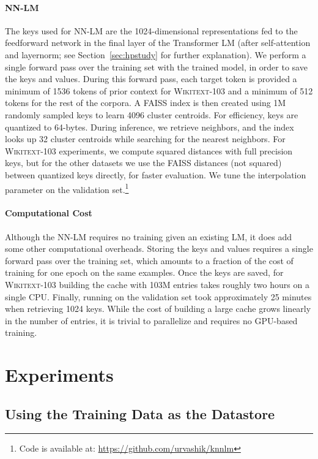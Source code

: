 \documentclass{article} \usepackage{iclr2020_conference,times}
\begin{document}
\paragraph{NN-LM}
The keys used for NN-LM are the 1024-dimensional representations fed to the feedforward network in the final layer of the Transformer LM (after self-attention and layernorm; see Section~\ref{sec:hpstudy} for further explanation).
We perform a single forward pass over the training set with the trained model, in order to save the keys and values.
During this forward pass, each target token is provided a minimum of 1536 tokens of prior context for \textsc{Wikitext-103} and a minimum of 512 tokens for the rest of the corpora.
A FAISS index is then created using 1M randomly sampled keys to learn 4096 cluster centroids. For efficiency, keys are quantized to 64-bytes.
During inference, we retrieve  neighbors, and the index looks up 32 cluster centroids while searching for the nearest neighbors.
For \textsc{Wikitext-103} experiments, we compute squared  distances with full precision keys, but for the other datasets we use the FAISS  distances (not squared) between quantized keys directly, for faster evaluation.
We tune the interpolation parameter  on the validation set.\footnote{Code is available at: \url{https://github.com/urvashik/knnlm}} 


\paragraph{Computational Cost}
Although the NN-LM requires no training given an existing LM, it does add some other computational overheads.
Storing the keys and values requires a single forward pass over the training set, which amounts to a fraction of the cost of training for one epoch on the same examples.
Once the keys are saved, for \textsc{Wikitext-103} building the cache with 103M entries takes roughly two hours on a single CPU.
Finally, running on the validation set took approximately 25 minutes when retrieving 1024 keys. 
While the cost of building a large cache grows linearly in the number of entries, it is trivial to parallelize and requires no GPU-based training.






\section{Experiments}

\subsection{Using the Training Data as the Datastore}
\label{sec:wikiresults}
\end{document}
